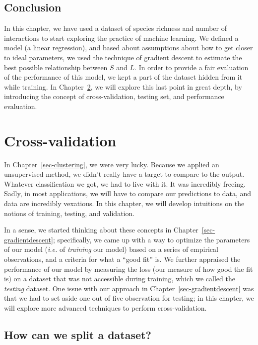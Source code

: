 \documentclass[
  letterpaper,
]{scrbook}
\begin{document}
\section{Conclusion}\label{conclusion-1}

In this chapter, we have used a dataset of species richness and number
of interactions to start exploring the practice of machine learning. We
defined a model (a linear regression), and based about assumptions about
how to get closer to ideal parameters, we used the technique of gradient
descent to estimate the best possible relationship between \(S\) and
\(L\). In order to provide a fair evaluation of the performance of this
model, we kept a part of the dataset hidden from it while training. In
Chapter~\ref{sec-crossvalidation}, we will explore this last point in
great depth, by introducing the concept of cross-validation, testing
set, and performance evaluation.


\chapter{Cross-validation}\label{sec-crossvalidation}

In Chapter~\ref{sec-clustering}, we were very lucky. Because we applied
an unsupervised method, we didn't really have a target to compare to the
output. Whatever classification we got, we had to live with it. It was
incredibly freeing. Sadly, in most applications, we will have to compare
our predictions to data, and data are incredibly vexatious. In this
chapter, we will develop intuitions on the notions of training, testing,
and validation.

In a sense, we started thinking about these concepts in
Chapter~\ref{sec-gradientdescent}; specifically, we came up with a way
to optimize the parameters of our model (\emph{i.e.} of \emph{training}
our model) based on a series of empirical observations, and a criteria
for what a ``good fit'' is. We further appraised the performance of our
model by measuring the loss (our measure of how good the fit is) on a
dataset that was not accessible during training, which we called the
\emph{testing} dataset. One issue with our approach in
Chapter~\ref{sec-gradientdescent} was that we had to set aside one out
of five observation for testing; in this chapter, we will explore more
advanced techniques to perform cross-validation.

\section{How can we split a dataset?}\label{how-can-we-split-a-dataset}
\end{document}
